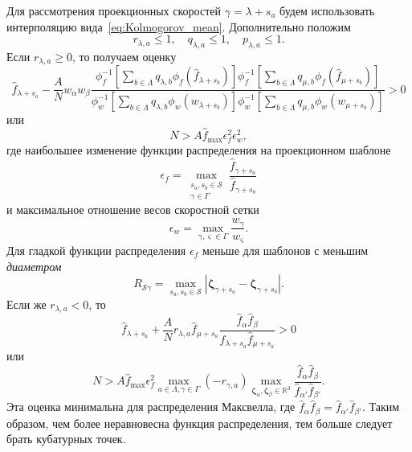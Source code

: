 \documentclass[a4paper,12pt]{article}
\newcommand{\bzeta}{\boldsymbol{\zeta}}
\begin{document}
Для рассмотрения проекционных скоростей \(\gamma = \lambda+s_a\)
будем использовать интерполяцию вида~\eqref{eq:Kolmogorov_mean}.
Дополнительно положим
\begin{equation}\label{eq:normal_stencil}
    r_{\lambda,a} \leq 1, \quad q_{\lambda,a} \leq 1, \quad p_{\lambda,a} \leq 1.
\end{equation}
Если \(r_{\lambda,a} \geq 0\), то получаем оценку
\begin{equation}\label{eq:positive_f_lambda+}
    \hat{f}_{\lambda+s_a} - \frac{A}{N} w_\alpha w_\beta
    \frac{
        \phi_f^{-1}\left[\sum_{b\in\Lambda} q_{\lambda,b} \phi_f\left(\hat{f}_{\lambda+s_b}\right)\right]
        \phi_f^{-1}\left[\sum_{b\in\Lambda} q_{\mu,b} \phi_f\left(\hat{f}_{\mu+s_b}\right)\right]
    }{
        \phi_w^{-1}\left[\sum_{b\in\Lambda} q_{\lambda,b} \phi_w\left(w_{\lambda+s_b}\right)\right]
        \phi_w^{-1}\left[\sum_{b\in\Lambda} q_{\mu,b} \phi_w\left(w_{\mu+s_b}\right)\right]
    }> 0
\end{equation}
или
\begin{equation}\label{eq:positive_f_lambda2+}
    N > A \hat{f}_{\max} \epsilon_f^2 \epsilon_w^2,
\end{equation}
где наибольшее изменение функции распределения на проекционном шаблоне
\begin{equation}\label{eq:epsilon_f}
    \epsilon_f = \max_{\substack{s_a,s_b\in\mathcal{S}\\\gamma\in\Gamma}} \frac{\hat{f}_{\gamma+s_a}}{\hat{f}_{\gamma+s_b}}
\end{equation}
и максимальное отношение весов скоростной сетки
\begin{equation}\label{eq:epsilon_w}
    \epsilon_w = \max_{\gamma,\varsigma\in\Gamma} \frac{w_\gamma}{w_\varsigma}.
\end{equation}
Для гладкой функции распределения \(\epsilon_f\) меньше для шаблонов с меньшим \emph{диаметром}
\begin{equation}\label{eq:stencil_diameter}
    R_{\mathcal{S}\gamma} = \max_{s_a,s_b\in\mathcal{S}}
        \left| \bzeta_{\gamma+s_a} - \bzeta_{\gamma+s_b} \right|.
\end{equation}
Если же \(r_{\lambda,a} < 0\), то
\begin{equation}\label{eq:positive_f_lambda-}
    \hat{f}_{\lambda+s_a} + \frac{A}{N}r_{\lambda,a}\hat{f}_{\mu+s_a}
        \frac{\hat{f}_{\alpha}\hat{f}_{\beta}}{\hat{f}_{\lambda+s_a}\hat{f}_{\mu+s_a}} > 0
\end{equation}
или
\begin{equation}\label{eq:positive_f_lambda2-}
    N > A \hat{f}_{\max} \epsilon_f^2
        \max_{a\in\Lambda,\gamma\in\Gamma}\left(-r_{\gamma,a}\right)
        \max_{\bzeta_\alpha,\bzeta_\beta\in\mathbb{R}^3}
        \frac{\hat{f}_{\alpha}\hat{f}_{\beta}}{\hat{f}_{\alpha'}\hat{f}_{\beta'}}.
\end{equation}
Эта оценка минимальна для распределения Максвелла,
где \(\hat{f}_{\alpha}\hat{f}_{\beta} = \hat{f}_{\alpha'}\hat{f}_{\beta'}\).
Таким образом, чем более неравновесна функция распределения,
тем больше следует брать кубатурных точек.
\end{document}
